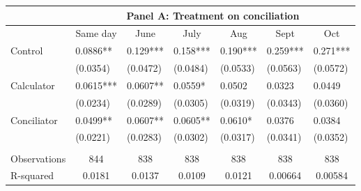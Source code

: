 \begin{tabular}{rrrrrrr}
\toprule
      & \multicolumn{6}{c}{Panel A: Treatment on conciliation} \\
\midrule
      & \multicolumn{1}{c}{Same day} & \multicolumn{1}{c}{June} & \multicolumn{1}{c}{July } & \multicolumn{1}{c}{Aug} & \multicolumn{1}{c}{Sept} & \multicolumn{1}{c}{Oct} \\
      \midrule
      \midrule
\multicolumn{1}{l}{Control} & \multicolumn{1}{l}{0.0886**} & \multicolumn{1}{l}{0.129***} & \multicolumn{1}{l}{0.158***} & \multicolumn{1}{l}{0.190***} & \multicolumn{1}{l}{0.259***} & \multicolumn{1}{l}{0.271***} \\
\multicolumn{1}{l}{} & \multicolumn{1}{l}{(0.0354)} & \multicolumn{1}{l}{(0.0472)} & \multicolumn{1}{l}{(0.0484)} & \multicolumn{1}{l}{(0.0533)} & \multicolumn{1}{l}{(0.0563)} & \multicolumn{1}{l}{(0.0572)} \\
\multicolumn{1}{l}{Calculator} & \multicolumn{1}{l}{0.0615***} & \multicolumn{1}{l}{0.0607**} & \multicolumn{1}{l}{0.0559*} & \multicolumn{1}{l}{0.0502} & \multicolumn{1}{l}{0.0323} & \multicolumn{1}{l}{0.0449} \\
\multicolumn{1}{l}{} & \multicolumn{1}{l}{(0.0234)} & \multicolumn{1}{l}{(0.0289)} & \multicolumn{1}{l}{(0.0305)} & \multicolumn{1}{l}{(0.0319)} & \multicolumn{1}{l}{(0.0343)} & \multicolumn{1}{l}{(0.0360)} \\
\multicolumn{1}{l}{Conciliator} & \multicolumn{1}{l}{0.0499**} & \multicolumn{1}{l}{0.0607**} & \multicolumn{1}{l}{0.0605**} & \multicolumn{1}{l}{0.0610*} & \multicolumn{1}{l}{0.0376} & \multicolumn{1}{l}{0.0384} \\
\multicolumn{1}{l}{} & \multicolumn{1}{l}{(0.0221)} & \multicolumn{1}{l}{(0.0283)} & \multicolumn{1}{l}{(0.0302)} & \multicolumn{1}{l}{(0.0317)} & \multicolumn{1}{l}{(0.0341)} & \multicolumn{1}{l}{(0.0352)} \\
\multicolumn{1}{l}{} &       &       &       &       &       &  \\
\midrule
\multicolumn{1}{l}{Observations} & \multicolumn{1}{c}{844} & \multicolumn{1}{c}{838} & \multicolumn{1}{c}{838} & \multicolumn{1}{c}{838} & \multicolumn{1}{c}{838} & \multicolumn{1}{c}{838} \\
\multicolumn{1}{l}{R-squared} & \multicolumn{1}{c}{0.0181} & \multicolumn{1}{c}{0.0137} & \multicolumn{1}{c}{0.0109} & \multicolumn{1}{c}{0.0121} & \multicolumn{1}{c}{0.00664} & \multicolumn{1}{c}{0.00584} \\

\end{tabular}
